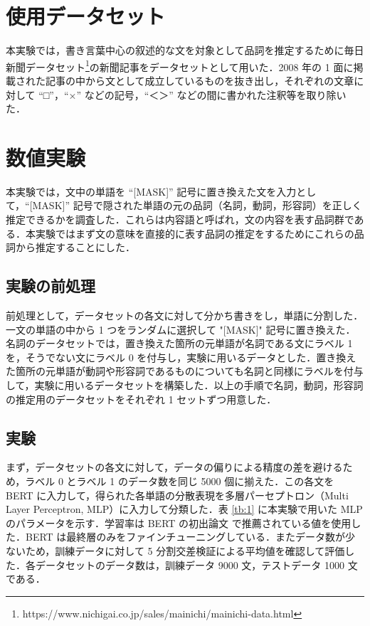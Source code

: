 \documentclass[twocolumn]{jarticle}
\begin{document}



\section{使用データセット}
本実験では，書き言葉中心の叙述的な文を対象として品詞を推定するために毎日新聞データセット\footnote{https://www.nichigai.co.jp/sales/mainichi/mainichi-data.html}の新聞記事をデータセットとして用いた．2008 年の 1 面に掲載された記事の中から文として成立しているものを抜き出し，それぞれの文章に対して “□”，“×” などの記号，“＜＞” などの間に書かれた注釈等を取り除いた．
　




\section{数値実験}
本実験では，文中の単語を “[MASK]” 記号に置き換えた文を入力として，“[MASK]” 記号で隠された単語の元の品詞（名詞，動詞，形容詞）を正しく推定できるかを調査した．これらは内容語と呼ばれ，文の内容を表す品詞群である．本実験ではまず文の意味を直接的に表す品詞の推定をするためにこれらの品詞から推定することにした．

  \subsection{実験の前処理}
前処理として，データセットの各文に対して分かち書きをし，単語に分割した．一文の単語の中から 1 つをランダムに選択して "[MASK]" 記号に置き換えた．名詞のデータセットでは，置き換えた箇所の元単語が名詞である文にラベル 1 を，そうでない文にラベル 0 を付与し，実験に用いるデータとした．置き換えた箇所の元単語が動詞や形容詞であるものについても名詞と同様にラベルを付与して，実験に用いるデータセットを構築した．以上の手順で名詞，動詞，形容詞の推定用のデータセットをそれぞれ 1 セットずつ用意した．\par

  \subsection{実験}
まず，データセットの各文に対して，データの偏りによる精度の差を避けるため，ラベル 0 とラベル 1 のデータ数を同じ 5000 個に揃えた．この各文を BERT に入力して，得られた各単語の分散表現を多層パーセプトロン（Multi Layer Perceptron, MLP）に入力して分類した．表 \ref{tb:1} に本実験で用いた MLP のパラメータを示す．学習率は BERT の初出論文 \cite{DBLP} で推薦されている値を使用した．BERT は最終層のみをファインチューニングしている．またデータ数が少ないため，訓練データに対して 5 分割交差検証による平均値を確認して評価した．各データセットのデータ数は，訓練データ 9000 文，テストデータ 1000 文である．
\end{document}
